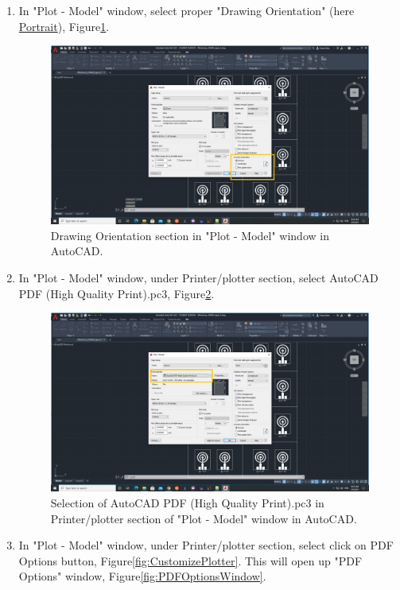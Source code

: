 \begin{enumerate}
	\item In "Plot - Model" window, select proper "Drawing Orientation" (here \underline{Portrait}),
	Figure\ref{fig:PrintOpenScreen}.

	\begin{figure}[H]
		\centering
		\includegraphics[angle=0,origin=c,width = .8\linewidth]{Section_ODMR_Antenna/Figures/PrintOpenScreen.png}
		\caption{Drawing Orientation section in "Plot - Model" window in AutoCAD.}
		\label{fig:PrintOpenScreen}
	\end{figure}

	\item In "Plot - Model" window, under Printer/plotter section, select AutoCAD PDF (High Quality Print).pc3, 
	Figure\ref{fig:ChoosePlotter1}.

	\begin{figure}[H]
		\centering
		\includegraphics[angle=0,origin=c,width = .8\linewidth]{Section_ODMR_Antenna/Figures/ChoosePlotter1.png}
		\caption{Selection of AutoCAD PDF (High Quality Print).pc3 in Printer/plotter section of "Plot - Model" 
			window in AutoCAD.}
		\label{fig:ChoosePlotter1}
	\end{figure}

	\item In "Plot - Model" window, under Printer/plotter section, select click on PDF Options button, 
	Figure\ref{fig:CustomizePlotter}. This will open up "PDF Options" window, Figure\ref{fig:PDFOptionsWindow}.


\end{enumerate}
